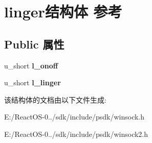 \hypertarget{structlinger}{}\section{linger结构体 参考}
\label{structlinger}
\subsection*{Public 属性}
\begin{DoxyCompactItemize}
\item 
\mbox{\label{structlinger_aa7623da169e180adeb45cd47e74c4bcd}} 
u\+\_\+short {\bfseries l\+\_\+onoff}
\item 
\mbox{\label{structlinger_ad2f6c2523a0128144bd947458b119ae0}} 
u\+\_\+short {\bfseries l\+\_\+linger}
\end{DoxyCompactItemize}


该结构体的文档由以下文件生成\+:\begin{DoxyCompactItemize}
\item 
E\+:/\+React\+O\+S-\/0../sdk/include/psdk/winsock.\+h\item 
E\+:/\+React\+O\+S-\/0../sdk/include/psdk/winsock2.\+h\end{DoxyCompactItemize}
